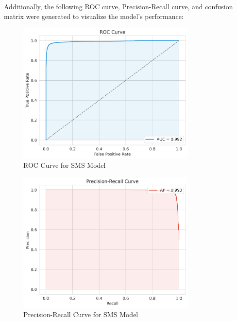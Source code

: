 \documentclass{article}
\begin{document}
\noindent
Additionally, the following ROC curve, Precision-Recall curve, and confusion matrix were generated to visualize the model's performance:

\begin{figure}[htbp]
    \centering
    \includegraphics[width=0.8\textwidth]{../analysis/sms/randomforest/roc_curve.png}
    \caption{ROC Curve for SMS Model}
    \label{fig:roc_curve_2}
\end{figure}

\begin{figure}[htbp]
    \centering
    \includegraphics[width=0.8\textwidth]{../analysis/sms/randomforest/precision_recall_curve.png}
    \caption{Precision-Recall Curve for SMS Model}
    \label{fig:precision_recall_curve_2}
\end{figure}
\end{document}
